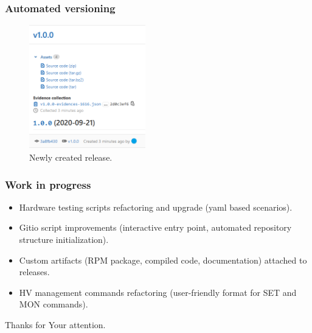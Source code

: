 \documentclass[10pt]{beamer}
\begin{document}
\begin{frame}[fragile]
\frametitle{Automated versioning}
\begin{figure}
    \centering
    \includegraphics[width=0.45\textwidth]{resources/new_release.PNG}
    \caption{Newly created release.}
\end{figure}
\end{frame}


\begin{frame}[fragile]
\frametitle{Work in progress}
\begin{itemize}
    \item Hardware testing scripts refactoring and upgrade (yaml based scenarios).
    \item Gitio script improvements (interactive entry point, automated repository structure initialization).
    \item Custom artifacts (RPM package, compiled code, documentation) attached to releases.
    \item HV management commands refactoring (user-friendly format for SET and MON commands).
\end{itemize}
\end{frame}

\begin{frame}[c]
\hfill
\begin{center}
\large{
	Thanks for Your attention.
}
\hfill
\end{center}
\end{frame}
\end{document}
